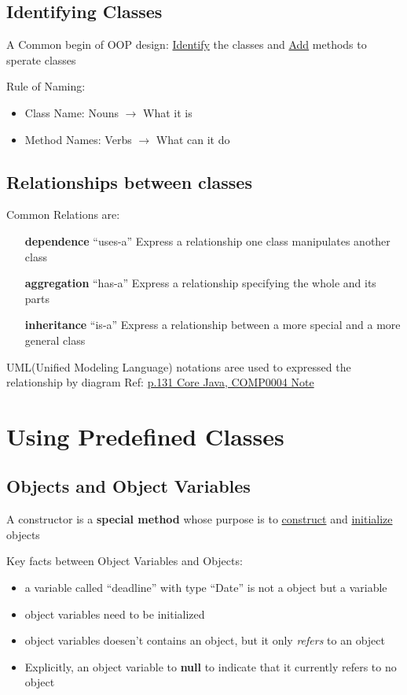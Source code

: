 \documentclass[12pt]{article}
\begin{document}
\subsection{Identifying Classes}
A Common begin of OOP design: \underline{Identify} the classes and \underline{Add} methods to sperate classes

Rule of Naming:
\begin{itemize}
    \item Class Name: Nouns $\rightarrow$ What it is 
    \item Method Names: Verbs $\rightarrow$ What can it do
\end{itemize}

\subsection{Relationships between classes}
Common Relations are:
\begin{itemize}
    \item[\textbf{dependence}] ``uses-a'' Express a relationship one class manipulates another class
    \item[\textbf{aggregation}] ``has-a'' Express a relationship specifying the whole and its parts
    \item[\textbf{inheritance}] ``is-a'' Express a relationship between a more special and a more general class
\end{itemize}

UML(Unified Modeling Language) notations aree used to expressed the relationship by diagram\newline
Ref: \underline{p.131 Core Java, COMP0004 Note}

\section{Using Predefined Classes}
\subsection{Objects and Object Variables}
A constructor is a \textbf{special method} whose purpose is to \underline{construct} and \underline{initialize} objects 

Key facts between Object Variables and Objects:
\begin{itemize}
    \item a variable called ``deadline'' with type ``Date'' is not a object but a variable
    \item object variables need to be initialized
    \item object variables doesen't contains an object, but it only \emph{refers} to an object
    \item Explicitly, an object variable to \textbf{null} to indicate that it currently refers to no object
\end{itemize}
\end{document}
